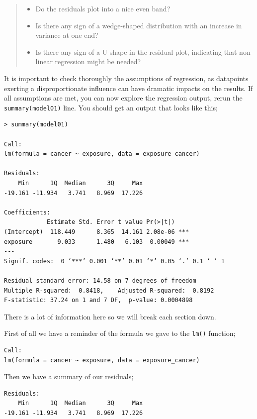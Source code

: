 \documentclass[
]{book}
\providecommand{\tightlist}{%
  \setlength{\itemsep}{0pt}\setlength{\parskip}{0pt}}
\begin{document}
\begin{quote}
\begin{itemize}
\tightlist
\item
  Do the residuals plot into a nice even band?
\item
  Is there any sign of a wedge-shaped distribution with an increase in variance at one end?
\item
  Is there any sign of a U-shape in the residual plot, indicating that non-linear regression might be needed?
\end{itemize}
\end{quote}

It is important to check thoroughly the assumptions of regression, as datapoints exerting a disproportionate influence can have dramatic impacts on the results. If all assumptions are met, you can now explore the regression output, rerun the \texttt{summary(model01)} line. You should get an output that looks like this;

\begin{verbatim}
> summary(model01)

Call:
lm(formula = cancer ~ exposure, data = exposure_cancer)

Residuals:
    Min      1Q  Median      3Q     Max 
-19.161 -11.934   3.741   8.969  17.226 

Coefficients:
            Estimate Std. Error t value Pr(>|t|)    
(Intercept)  118.449      8.365  14.161 2.08e-06 ***
exposure       9.033      1.480   6.103  0.00049 ***
---
Signif. codes:  0 ‘***’ 0.001 ‘**’ 0.01 ‘*’ 0.05 ‘.’ 0.1 ‘ ’ 1

Residual standard error: 14.58 on 7 degrees of freedom
Multiple R-squared:  0.8418,    Adjusted R-squared:  0.8192 
F-statistic: 37.24 on 1 and 7 DF,  p-value: 0.0004898
\end{verbatim}

There is a lot of information here so we will break each section down.

First of all we have a reminder of the formula we gave to the \texttt{lm()} function;

\begin{verbatim}
Call:
lm(formula = cancer ~ exposure, data = exposure_cancer)
\end{verbatim}

Then we have a summary of our residuals;

\begin{verbatim}
Residuals:
    Min      1Q  Median      3Q     Max 
-19.161 -11.934   3.741   8.969  17.226 
\end{verbatim}
\end{document}
